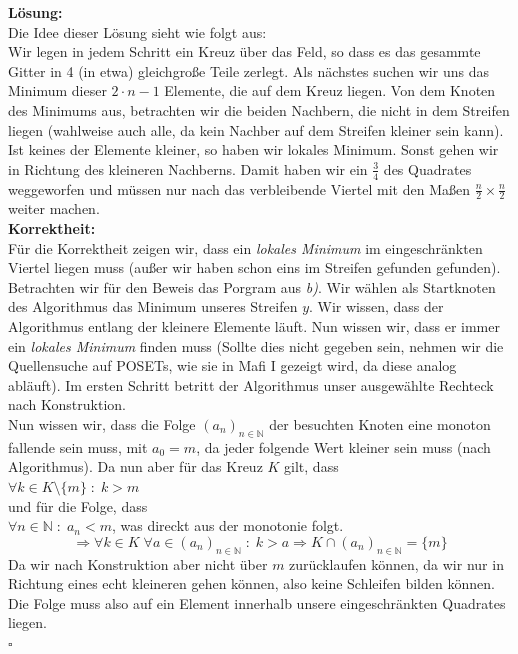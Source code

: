 \documentclass[11pt,a4paper,ngerman]{article}
\begin{document}
\begin{enumerate}[\bfseries (a)]
\textbf{Lösung:}\\

Die Idee dieser Lösung sieht wie folgt aus:\\
Wir legen in jedem Schritt ein Kreuz über das Feld, so dass es das gesammte Gitter in 4 (in etwa) gleichgroße Teile zerlegt. Als nächstes suchen wir uns das Minimum dieser $2 \cdot n - 1$ Elemente, die auf dem Kreuz liegen. Von dem Knoten des Minimums aus, betrachten wir die beiden Nachbern, die nicht in dem Streifen liegen (wahlweise auch alle, da kein Nachber auf dem Streifen kleiner sein kann). Ist keines der Elemente kleiner, so haben wir lokales Minimum. Sonst gehen wir in Richtung des kleineren Nachberns.
Damit haben wir ein $\frac{3}{4}$ des Quadrates weggeworfen und müssen nur nach das verbleibende Viertel mit den Maßen $\frac{n}{2} \times \frac{n}{2}$ weiter machen.\\

\textbf{Korrektheit:}\\
Für die Korrektheit zeigen wir, dass ein \emph{lokales Minimum} im eingeschränkten Viertel liegen muss (außer wir haben schon eins im Streifen gefunden gefunden).\\

Betrachten wir für den Beweis das Porgram aus \emph{b)}. Wir wählen als Startknoten des Algorithmus das Minimum unseres Streifen $y$. Wir wissen, dass der Algorithmus entlang der kleinere Elemente läuft. Nun wissen wir, dass er immer ein \emph{lokales Minimum} finden muss (Sollte dies nicht gegeben sein, nehmen wir die Quellensuche auf POSETs, wie sie in Mafi I gezeigt wird, da diese analog abläuft).
Im ersten Schritt betritt der Algorithmus unser ausgewählte Rechteck nach Konstruktion.\\

Nun wissen wir, dass die Folge $(a_n)_{n \in \mathbb{N}}$ der besuchten Knoten eine monoton fallende sein muss, mit $a_0 = m$, da jeder folgende Wert kleiner sein muss (nach Algorithmus). Da nun aber für das Kreuz $K$ gilt, dass\\
$\forall k \in K \setminus \{m\} \; : \; k > m$\\
und für die Folge, dass\\
$\forall n \in \mathbb{N} \; : \; a_n < m$, was direckt aus der monotonie folgt.
$$
\Rightarrow \forall k \in K \; \forall a \in (a_n)_{n \in \mathbb{N}} \; : \; k > a \Rightarrow K \cap (a_n)_{n \in \mathbb{N}} = \{m\}
$$
Da wir nach Konstruktion aber nicht über $m$ zurücklaufen können, da wir nur in Richtung eines echt kleineren gehen können, also keine Schleifen bilden können. Die Folge muss also auf ein Element innerhalb unsere eingeschränkten Quadrates liegen.\\
\mbox{} \hfill $\square$


\end{enumerate}
\end{document}
